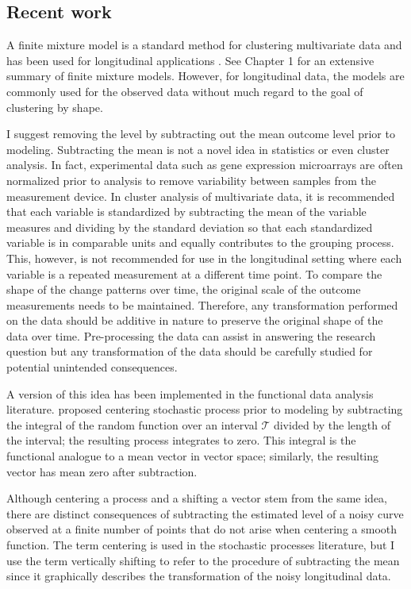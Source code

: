 \subsection{Recent work}
A finite mixture model is a standard method for clustering multivariate data \cite{everitt2009} and has been used for longitudinal applications \cite{muthen2010, jones2001}. See Chapter 1 for an extensive summary of finite mixture models. However, for longitudinal data, the models are commonly used for the observed data without much regard to the goal of clustering by shape. 

I suggest removing the level by subtracting out the mean outcome level prior to modeling. Subtracting the mean is not a novel idea in statistics or even cluster analysis. In fact, experimental data such as gene expression microarrays are often normalized prior to analysis to remove variability between samples from the measurement device. In cluster analysis of multivariate data, it is recommended that each variable is standardized by subtracting the mean of the variable measures and dividing by the standard deviation so that each standardized variable is in comparable units and equally contributes to the grouping process. This, however, is not recommended for use in the longitudinal setting where each variable is a repeated measurement at a different time point. To compare the shape of the change patterns over time, the original scale of the outcome measurements needs to be maintained. Therefore, any transformation performed on the data should be additive in nature to preserve the original shape of the data over time. Pre-processing the data can assist in answering the research question but any transformation of the data should be carefully studied for potential unintended consequences.

A version of this idea has been implemented in the functional data analysis literature. \Textcite{chiou2008} proposed centering stochastic process prior to modeling by subtracting the integral of the random function over an interval $\mathcal{T}$ divided by the length of the interval; the resulting process integrates to zero. This integral is the functional analogue to a mean vector in vector space; similarly, the resulting vector has mean zero after subtraction.

 Although centering a process and a shifting a vector stem from the same idea, there are distinct consequences of subtracting the estimated level of a noisy curve observed at a finite number of points that do not arise when centering a smooth function. The term centering is used in the stochastic processes literature, but I use the term vertically shifting to refer to the procedure of subtracting the mean since it graphically describes the transformation of the noisy longitudinal data.

